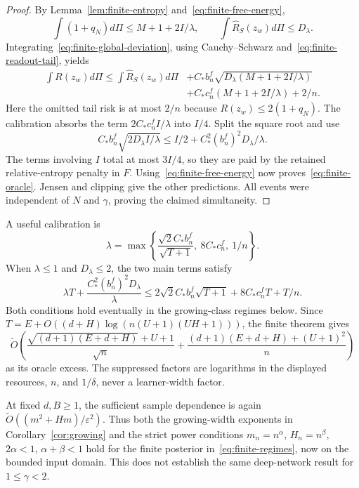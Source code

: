 \begin{proof}
By Lemma~\ref{lem:finite-entropy} and~\eqref{eq:finite-free-energy},
\[
 \int(1+q_N)d\Pi\leq M+1+2I/\lambda,
 \qquad \int\widehat R_S(z_w)d\Pi\leq D_\lambda.
\]
Integrating~\eqref{eq:finite-global-deviation}, using Cauchy--Schwarz and~\eqref{eq:finite-readout-tail}, yields
\begin{align*}
 \int R(z_w)d\Pi
 \leq \int\widehat R_S(z_w)d\Pi
 &+C_*b_n^f\sqrt{D_\lambda(M+1+2I/\lambda)}\\
 &+C_*c_n^f(M+1+2I/\lambda)+2/n.
\end{align*}
Here the omitted tail risk is at most $2/n$ because $R(z_w)\leq2(1+q_N)$. The calibration absorbs the term $2C_*c_n^fI/\lambda$ into $I/4$. Split the square root and use
\[
 C_*b_n^f\sqrt{2D_\lambda I/\lambda}
 \leq I/2+C_*^2(b_n^f)^2D_\lambda/\lambda.
\]
The terms involving $I$ total at most $3I/4$, so they are paid by the retained relative-entropy penalty in $F$. Using~\eqref{eq:finite-free-energy} now proves~\eqref{eq:finite-oracle}. Jensen and clipping give the other predictions. All events were independent of $N$ and $\gamma$, proving the claimed simultaneity.
\end{proof}

A useful calibration is
\begin{equation}
 \lambda=\max\left\{
 \frac{\sqrt2C_*b_n^f}{\sqrt{T+1}},\ 8C_*c_n^f,\ 1/n\right\}.
 \label{eq:finite-optimized-calibration}
\end{equation}
When $\lambda\leq1$ and $D_\lambda\leq2$, the two main terms satisfy
\[
 \lambda T+\frac{C_*^2(b_n^f)^2D_\lambda}{\lambda}
 \leq2\sqrt2C_*b_n^f\sqrt{T+1}+8C_*c_n^fT+T/n.
\]
Both conditions hold eventually in the growing-class regimes below. Since
$T=E+O((d+H)\log(n(U+1)(UH+1)))$, the finite theorem gives
\begin{equation}
 \widetilde O\left(
   \frac{\sqrt{(d+1)(E+d+H)}+U+1}{\sqrt n}
   +\frac{(d+1)(E+d+H)+(U+1)^2}{n}\right)
 \label{eq:finite-rate}
\end{equation}
as its oracle excess. The suppressed factors are logarithms in the displayed resources, $n$, and $1/\delta$, never a learner-width factor.

At fixed $d,B\geq1$, the sufficient sample dependence is again
$\widetilde O((m^2+Hm)/\varepsilon^2)$. Thus both the growing-width exponents in Corollary~\ref{cor:growing} and the strict power conditions $m_n=n^\alpha$, $H_n=n^\beta$, $2\alpha<1$, $\alpha+\beta<1$ hold for the finite posterior in~\eqref{eq:finite-regimes}, now on the bounded input domain. This does not establish the same deep-network result for $1\leq\gamma<2$.
